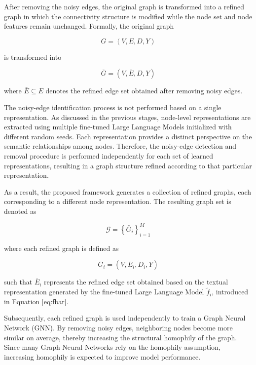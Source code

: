 \documentclass{article}
\begin{document}
After removing the noisy edges, the original graph is transformed into a refined graph in which the connectivity structure is modified while the node set and node features remain unchanged. Formally, the original graph

\begin{equation}
G = (V, E, D, Y)
\label{eq:original_graph}
\end{equation}

is transformed into

\begin{equation}
\bar{G} = (V, \bar{E}, D, Y)
\label{eq:refined_graph_single}
\end{equation}

where \(\bar{E} \subseteq E\) denotes the refined edge set obtained after removing noisy edges.

The noisy-edge identification process is not performed based on a single representation. As discussed in the previous stages, node-level representations are extracted using multiple fine-tuned Large Language Models initialized with different random seeds. Each representation provides a distinct perspective on the semantic relationships among nodes. Therefore, the noisy-edge detection and removal procedure is performed independently for each set of learned representations, resulting in a graph structure refined according to that particular representation.

As a result, the proposed framework generates a collection of refined graphs, each corresponding to a different node representation. The resulting graph set is denoted as

\begin{equation}
\mathcal{G} = \left\{ \bar{G}_i \right\}_{i=1}^{M}
\label{eq:graph_set}
\end{equation}

where each refined graph is defined as

\begin{equation}
\bar{G}_i = (V, \bar{E}_i, D_i, Y)
\label{eq:refined_graph}
\end{equation}

such that \(\bar{E}_i\) represents the refined edge set obtained based on the textual representation generated by the fine-tuned Large Language Model \(\tilde{f}_i\), introduced in Equation \eqref{eq:fbar}.

Subsequently, each refined graph is used independently to train a Graph Neural Network (GNN). By removing noisy edges, neighboring nodes become more similar on average, thereby increasing the structural homophily of the graph. Since many Graph Neural Networks rely on the homophily assumption, increasing homophily is expected to improve model performance.
\end{document}
